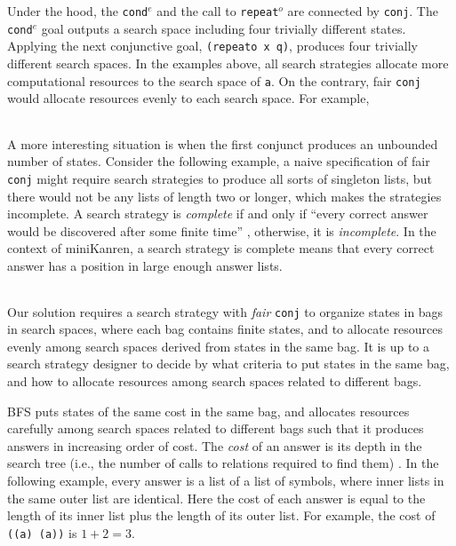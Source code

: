 \documentclass[format=acmlarge, review=true, authordraft=true]{acmart}
\newcommand{\conde}{\texttt{cond$^e$}}
\newcommand{\conj}{\texttt{conj}}
\newcommand{\repeato}{\texttt{repeat$^o$}}
\newcommand{\BFS}[0]{BFS}
\begin{document}
Under the hood, the \conde{} and the call to \repeato{} are connected by 
\conj{}. The \conde{} goal outputs a search space including four trivially 
different states. 
Applying the next conjunctive goal, \texttt{(repeato x q)}, produces four 
trivially different search spaces.
In the examples above, all search strategies allocate more computational 
resources to the search space of \texttt{a}. On the contrary, fair \conj{} 
would allocate resources evenly to each search space. For example,

\begin{center}
	\begin{tabular}{c}
		
	\end{tabular}
\end{center}

A more interesting situation is when the first conjunct produces an unbounded
number of states. Consider the following example, a naive specification of 
fair \conj{} 
might require search strategies to produce all sorts of singleton lists, but 
there
would not be any lists of length two or longer, which makes the strategies 
incomplete. 
A search strategy is \emph{complete} if and only if ``every correct answer 
would be discovered after some finite time'' \cite{seres1999algebra}, 
otherwise, it is \emph{incomplete}. In the 
context of miniKanren, a search strategy is complete means that every correct 
answer has a position in large enough answer lists.

\begin{center}
	\begin{tabular}{c}
		
	\end{tabular}
\end{center}

Our solution requires a search strategy with \emph{fair} \conj{} to organize
states in bags in search spaces, where each bag contains finite states, and 
to allocate resources evenly among search spaces derived from states in the 
same bag. It is up to a search strategy designer to decide by what criteria to 
put states in the same bag, and how to allocate resources among search spaces 
related to different bags.

\BFS{} puts states of the same cost in the same bag, and allocates
resources carefully among search spaces related to different bags such
that it produces answers in increasing order of cost. The \emph{cost}
of an answer is its depth in the search tree (i.e., the number of
calls to relations required to find them) \citep{seres1999algebra}. In
the following example, every answer is a list of a list of symbols,
where inner lists in the same outer list are identical. Here the cost of each 
answer is equal
to the length of its inner list plus the length of its outer list. For example,
the cost of \texttt{((a) (a))} is $1 + 2 = 3$.
\end{document}
